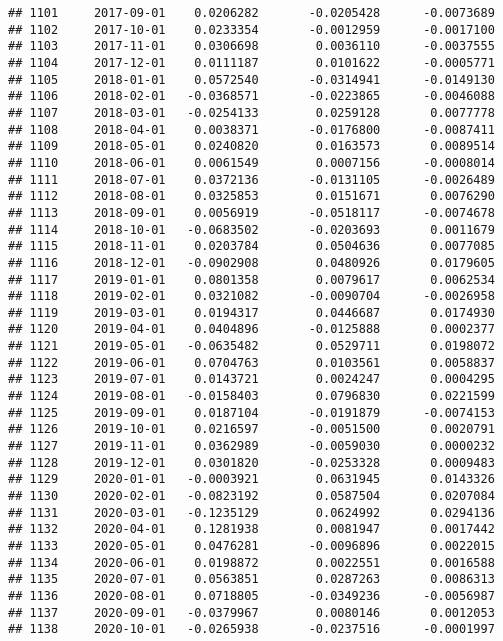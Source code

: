 \documentclass[
]{article}
\begin{document}
\begin{verbatim}
## 1101     2017-09-01    0.0206282       -0.0205428      -0.0073689
## 1102     2017-10-01    0.0233354       -0.0012959      -0.0017100
## 1103     2017-11-01    0.0306698        0.0036110      -0.0037555
## 1104     2017-12-01    0.0111187        0.0101622      -0.0005771
## 1105     2018-01-01    0.0572540       -0.0314941      -0.0149130
## 1106     2018-02-01   -0.0368571       -0.0223865      -0.0046088
## 1107     2018-03-01   -0.0254133        0.0259128       0.0077778
## 1108     2018-04-01    0.0038371       -0.0176800      -0.0087411
## 1109     2018-05-01    0.0240820        0.0163573       0.0089514
## 1110     2018-06-01    0.0061549        0.0007156      -0.0008014
## 1111     2018-07-01    0.0372136       -0.0131105      -0.0026489
## 1112     2018-08-01    0.0325853        0.0151671       0.0076290
## 1113     2018-09-01    0.0056919       -0.0518117      -0.0074678
## 1114     2018-10-01   -0.0683502       -0.0203693       0.0011679
## 1115     2018-11-01    0.0203784        0.0504636       0.0077085
## 1116     2018-12-01   -0.0902908        0.0480926       0.0179605
## 1117     2019-01-01    0.0801358        0.0079617       0.0062534
## 1118     2019-02-01    0.0321082       -0.0090704      -0.0026958
## 1119     2019-03-01    0.0194317        0.0446687       0.0174930
## 1120     2019-04-01    0.0404896       -0.0125888       0.0002377
## 1121     2019-05-01   -0.0635482        0.0529711       0.0198072
## 1122     2019-06-01    0.0704763        0.0103561       0.0058837
## 1123     2019-07-01    0.0143721        0.0024247       0.0004295
## 1124     2019-08-01   -0.0158403        0.0796830       0.0221599
## 1125     2019-09-01    0.0187104       -0.0191879      -0.0074153
## 1126     2019-10-01    0.0216597       -0.0051500       0.0020791
## 1127     2019-11-01    0.0362989       -0.0059030       0.0000232
## 1128     2019-12-01    0.0301820       -0.0253328       0.0009483
## 1129     2020-01-01   -0.0003921        0.0631945       0.0143326
## 1130     2020-02-01   -0.0823192        0.0587504       0.0207084
## 1131     2020-03-01   -0.1235129        0.0624992       0.0294136
## 1132     2020-04-01    0.1281938        0.0081947       0.0017442
## 1133     2020-05-01    0.0476281       -0.0096896       0.0022015
## 1134     2020-06-01    0.0198872        0.0022551       0.0016588
## 1135     2020-07-01    0.0563851        0.0287263       0.0086313
## 1136     2020-08-01    0.0718805       -0.0349236      -0.0056987
## 1137     2020-09-01   -0.0379967        0.0080146       0.0012053
## 1138     2020-10-01   -0.0265938       -0.0237516      -0.0001997

\end{verbatim}
\end{document}

